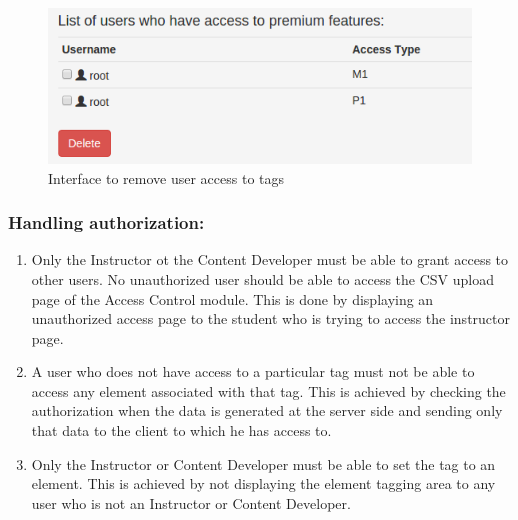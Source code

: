 \begin{figure}[h]
\centering
\includegraphics[width=0.8\linewidth]{./media/removeusers}
\caption{Interface to remove user access to tags}
\label{fig:removeusers}
\end{figure}

\subsubsection*{Handling authorization:}

\begin{enumerate}
	\item Only the Instructor ot the Content Developer must be able to grant access to other users. No unauthorized user should be able to access the CSV upload page of the Access Control module. This is done by displaying an unauthorized access page to the student who is trying to access the instructor page.
	\item A user who does not have access to a particular tag must not be able to access any element associated with that tag. This is achieved by checking the authorization when the data is generated at the server side and sending only that data to the client to which he has access to.
	\item Only the Instructor or Content Developer must be able to set the tag to an element. This is achieved by not displaying the element tagging area to any user who is not an Instructor or Content Developer.
\end{enumerate}

